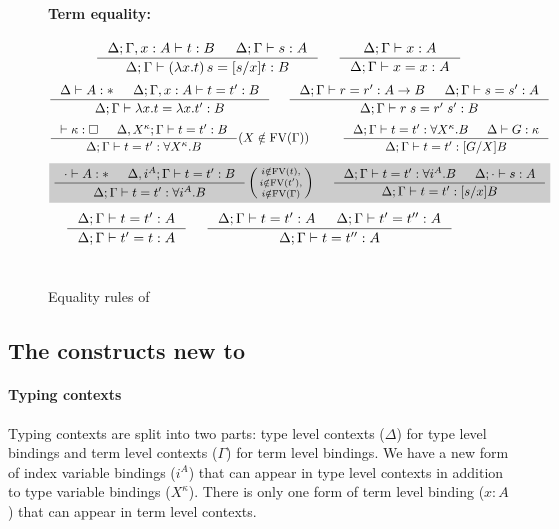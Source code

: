 \begin{figure*}
\paragraph{Term equality:} 
$ \qquad
 ~~~~
   \inference{\Delta;\Gamma,x:A |- t:B & \Delta;\Gamma |- s:A}
             {\Delta;\Gamma |- (\lambda x.t)\,s=[s/x]t : B}
 ~~~~
   \inference{\Delta;\Gamma |- x:A}{\Delta;\Gamma |- x=x:A}
$
\[ \inference{\Delta |- A:* & \Delta;\Gamma,x:A |- t=t':B}
             {\Delta;\Gamma |- \lambda x.t = \lambda x.t':B}
 ~~~~
   \inference{\Delta;\Gamma |- r=r':A-> B & \Delta;\Gamma |- s=s':A}
             {\Delta;\Gamma |- r\;s=r'\;s':B}
\]
\[ \inference{|- \kappa:\square & \Delta, X^\kappa;\Gamma |- t=t' : B}
             {\Delta;\Gamma |- t=t' : \forall X^\kappa.B}
	     (X\notin\FV(\Gamma))
 ~~~~ ~~~~
   \inference{ \Delta;\Gamma |- t=t' : \forall X^\kappa.B
             & \Delta |- G:\kappa }
             {\Delta;\Gamma |- t=t' : [G/X]B}
\]
\[ \newFi{
   \inference{\cdot |- A:* & \Delta, i^A;\Gamma |- t=t' : B}
             {\Delta;\Gamma |- t=t' : \forall i^A.B}
   \left(\begin{smallmatrix}
		i\notin\FV(t),\\
		i\notin\FV(t'),\\
		i\notin\FV(\Gamma)\end{smallmatrix}\right)
 ~~~~
   \inference{ \Delta;\Gamma |- t=t' : \forall i^A.B
             & \Delta;\cdot |- s:A}
             {\Delta;\Gamma |- t=t' : [s/x]B} }
\]
\[ \inference{\Delta;\Gamma |- t=t':A}{\Delta;\Gamma |- t'=t:A}
 ~~~~
   \inference{\Delta;\Gamma |- t=t':A & \Delta;\Gamma |- t'=t'':A}
             {\Delta;\Gamma |- t=t'':A}
\]
~\\
\caption{Equality rules of \Fi}
\label{fig:eqFi}
\end{figure*}

\subsection{The constructs new to \Fi}

\paragraph{Typing contexts}
Typing contexts are split into two parts:
type level contexts ($\Delta$) for type level bindings
and term level contexts ($\Gamma$) for term level bindings.
We have a new form of index variable bindings ($i^A$) that can appear in
type level contexts in addition to type variable bindings ($X^\kappa$).
There is only one form of term level binding ($x:A$) that can appear in
term level contexts.

